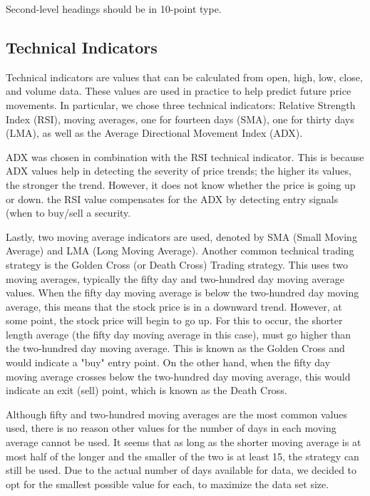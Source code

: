 \documentclass{article}
\begin{document}
Second-level headings should be in 10-point type.

\subsection{Technical Indicators}

Technical indicators are values that can be calculated from open, high, low, close, and volume data. These values are used in practice to help predict future price movements. In particular, we chose three technical indicators: Relative Strength Index (RSI), moving averages, one for fourteen days (SMA), one for thirty days (LMA), as well as the Average Directional Movement Index (ADX).

ADX was chosen in combination with the RSI technical indicator. This is because ADX values help in detecting the severity of price trends; the higher its values, the stronger the trend. However, it does not know whether the price is going up or down. the RSI value compensates for the ADX by detecting entry signals (when to buy/sell a security.

Lastly, two moving average indicators are used, denoted by SMA (Small Moving Average) and LMA (Long Moving Average). Another common technical trading strategy is the Golden Cross (or Death Cross) Trading strategy. This uses two moving averages, typically the fifty day and two-hundred day moving average values. When the fifty day moving average is below the two-hundred day moving average, this means that the stock price is in a downward trend. However, at some point, the stock price will begin to go up. For this to occur, the shorter length average (the fifty day moving average in this case), must go higher than the two-hundred day moving average. This is known as the Golden Cross and would indicate a "buy" entry point. On the other hand, when the fifty day moving average crosses below the two-hundred day moving average, this would indicate an exit (sell) point, which is known as the Death Cross.

Although fifty and two-hundred moving averages are the most common values used, there is no reason other values for the number of days in each moving average cannot be used. It seems that as long as the shorter moving average is at most half of the longer and the smaller of the two is at least 15, the strategy can still be used. Due to the actual number of days available for data, we decided to opt for the smallest possible value for each, to maximize the data set size.
\end{document}
